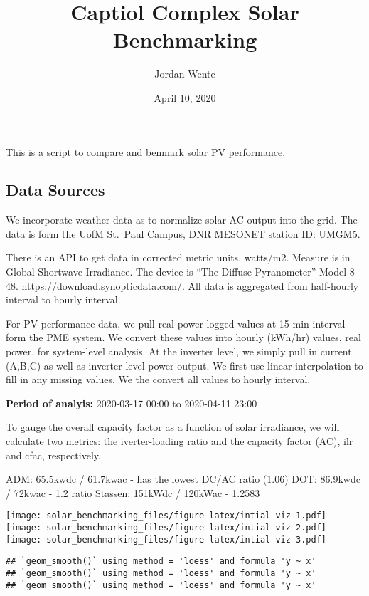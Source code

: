 \documentclass[]{article}
\title{Captiol Complex Solar Benchmarking}
\author{Jordan Wente}
\date{April 10, 2020}
\begin{document}
\maketitle

This is a script to compare and benmark solar PV performance.

\subsection{Data Sources}\label{data-sources}

We incorporate weather data as to normalize solar AC output into the
grid. The data is form the UofM St.~Paul Campus, DNR MESONET station ID:
UMGM5.

There is an API to get data in corrected metric units, watts/m2. Measure
is in Global Shortwave Irradiance. The device is ``The Diffuse
Pyranometer'' Model 8-48. \url{https://download.synopticdata.com/}. All
data is aggregated from half-hourly interval to hourly interval.

For PV performance data, we pull real power logged values at 15-min
interval form the PME system. We convert these values into hourly
(kWh/hr) values, real power, for system-level analysis. At the inverter
level, we simply pull in current (A,B,C) as well as inverter level power
output. We first use linear interpolation to fill in any missing values.
We the convert all values to hourly interval.

\textbf{Period of analyis:} 2020-03-17 00:00 to 2020-04-11 23:00

To gauge the overall capacity factor as a function of solar irradiance,
we will calculate two metrics: the iverter-loading ratio and the
capacity factor (AC), ilr and cfac, respectively.

ADM: 65.5kwdc / 61.7kwac - has the lowest DC/AC ratio (1.06) DOT:
86.9kwdc / 72kwac - 1.2 ratio Stassen: 151kWdc / 120kWac - 1.2583

\texttt{[image: solar\_benchmarking\_files/figure-latex/intial viz-1.pdf]}
\texttt{[image: solar\_benchmarking\_files/figure-latex/intial viz-2.pdf]}
\texttt{[image: solar\_benchmarking\_files/figure-latex/intial viz-3.pdf]}

\begin{verbatim}
## `geom_smooth()` using method = 'loess' and formula 'y ~ x'
## `geom_smooth()` using method = 'loess' and formula 'y ~ x'
## `geom_smooth()` using method = 'loess' and formula 'y ~ x'
\end{verbatim}
\end{document}
